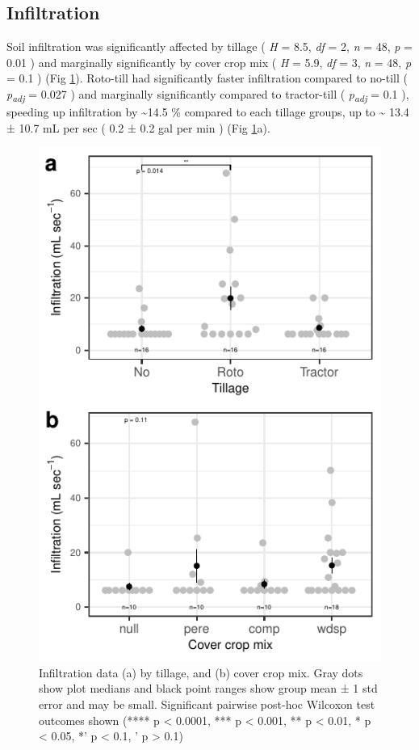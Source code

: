 \documentclass[
  12pt,
]{article}
\begin{document}
\hypertarget{infiltration}{%
\subsection{Infiltration}\label{infiltration}}

Soil infiltration was significantly affected by tillage (
\emph{H} = 8.5,
\emph{df} = 2,
\emph{n} = 48,
\emph{p} = 0.01
) and marginally significantly by cover crop mix (
\emph{H} = 5.9,
\emph{df} = 3,
\emph{n} = 48,
\emph{p} = 0.1
) (Fig \ref{fig:infilFig}).
Roto-till had significantly faster infiltration compared to no-till (
\emph{p\textsubscript{adj}} = 0.027
) and marginally significantly compared to tractor-till (
\emph{p\textsubscript{adj}} = 0.1
), speeding up infiltration by
\textasciitilde14.5 \%
compared to each tillage groups,
up to
\textasciitilde{} 13.4 ±
10.7 mL per sec
(
0.2 ±
0.2 gal per min
)
(Fig \ref{fig:infilFig}a).

\begin{figure}
\centering
\includegraphics{merge_files/figure-latex/infilFig-1.pdf}
\caption{\label{fig:infilFig}Infiltration data (a) by tillage, and (b) cover crop mix. Gray dots show plot medians and black point ranges show group mean ± 1 std error and may be small. Significant pairwise post-hoc Wilcoxon test outcomes shown (**** p \textless{} 0.0001, *** p \textless{} 0.001, ** p \textless{} 0.01, * p \textless{} 0.05, *' p \textless{} 0.1, ' p \textgreater{} 0.1)}
\end{figure}
\end{document}

